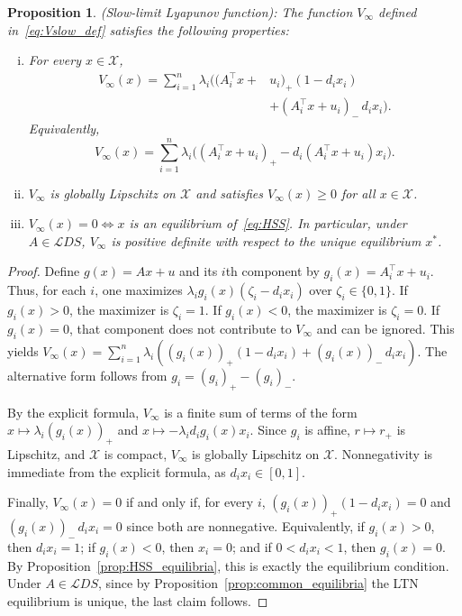 \documentclass[letterpaper, conference]{ieeeconf}
\newcommand{\X}{\mathcal X}
\newtheorem{proposition}[theorem]{Proposition}
\newcommand{\longthmtitle}[1]{\mbox{}{\textit{(#1):}}}
\newcommand{\1}{\mathbf{1}}
\newcommand{\mc}{\mathcal}
\begin{document}
\begin{proposition}\longthmtitle{Slow-limit Lyapunov function}
\label{prop:Vslow_properties}
The function \(V_\infty\) defined in~\eqref{eq:Vslow_def} satisfies the following properties:
\begin{enumerate}[i)]
\item For every \(x\in\X\),
\begin{align*}
    V_\infty(x)
    =
    \sum_{i=1}^n
    \lambda_i\Big((A_i^\top x +& u_i)_+(1-d_i x_i)\\&+(A_i^\top x + u_i)_-\,d_i x_i\Big).
\end{align*}
Equivalently,
\[
V_\infty(x)
=
\sum_{i=1}^n
\lambda_i\Big((A_i^\top x + u_i)_+-d_i (A_i^\top x + u_i)x_i\Big).
\]
\item \(V_\infty\) is globally Lipschitz on \(\X\) and satisfies \(V_\infty(x)\ge0\) for all \(x\in\X\).
\item \(V_\infty(x)=0 \iff x\) is an equilibrium of~\eqref{eq:HSS}.
In particular, under \(A \in \mc LDS\), \(V_\infty\) is positive definite with respect to the unique equilibrium \(x^*\).
\end{enumerate}
\end{proposition}

\begin{proof}
Define \(g(x) = Ax + u\) and its \(i\)th component by \(g_i(x) = A_i^\top x + u_i\).
Thus, for each \(i\), one maximizes \(\lambda_i g_i(x)(\zeta_i-d_i x_i)\) over \(\zeta_i\in\{0,1\}\). 
If \(g_i(x)>0\), the maximizer is \(\zeta_i=1\). 
If \(g_i(x)<0\), the maximizer is \(\zeta_i=0\). 
If \(g_i(x)=0\), that component does not contribute to \(V_\infty\) and can be ignored. 
This yields
\(V_\infty(x)
=
\sum_{i=1}^n
\lambda_i\left((g_i(x))_+(1-d_i x_i)+(g_i(x))_-\,d_i x_i\right)\).
The alternative form follows from \(g_i = (g_i)_+ - (g_i)_-\).

By the explicit formula, \(V_\infty\) is a finite sum of terms of the form \(x\mapsto \lambda_i(g_i(x))_+\) and \(x\mapsto -\lambda_i d_i g_i(x)x_i\). Since \(g_i\) is affine, \(r\mapsto r_+\) is Lipschitz, and \(\X\) is compact, \(V_\infty\) is globally Lipschitz on \(\X\). Nonnegativity is immediate from the explicit formula, as \(d_ix_i \in [0, 1]\).

Finally, \(V_\infty(x)=0\) if and only if, for every \(i\), \((g_i(x))_+(1-d_i x_i)=0\) and \((g_i(x))_-\,d_i x_i=0\) since both are nonnegative.
Equivalently, if \(g_i(x)>0\), then \(d_i x_i=1\); if \(g_i(x)<0\), then \(x_i=0\); and if \(0<d_i x_i<1\), then \(g_i(x)=0\). 
By Proposition~\ref{prop:HSS_equilibria}, this is exactly the equilibrium condition. 
Under \(A \in \mc LDS\), since by Proposition~\ref{prop:common_equilibria} the LTN equilibrium is unique, the last claim follows.
\end{proof}
\end{document}
